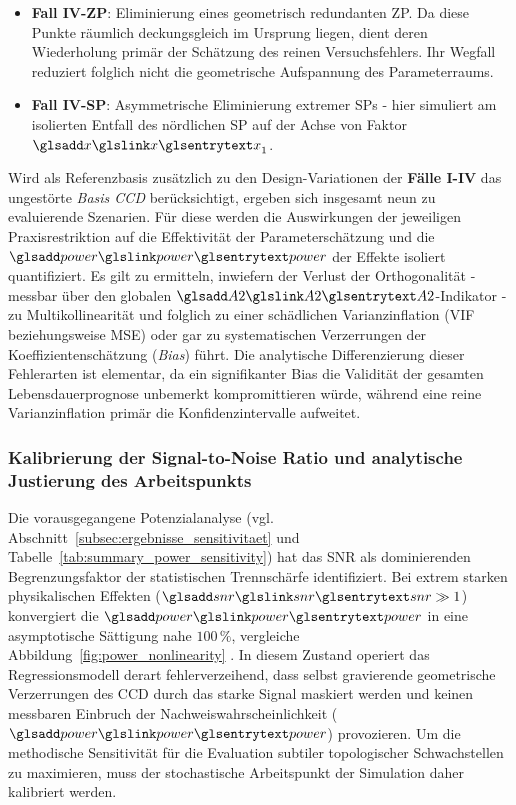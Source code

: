 \begin{itemize}
          \begin{itemize}
              \item \textbf{Fall IV-\ac{ZP}}: Eliminierung eines geometrisch redundanten \ac{ZP}. Da diese Punkte räumlich deckungsgleich im Ursprung liegen, dient deren Wiederholung primär der Schätzung des reinen Versuchsfehlers. Ihr Wegfall reduziert folglich nicht die geometrische Aufspannung des Parameterraums.
              \item \textbf{Fall IV-\ac{SP}}: Asymmetrische Eliminierung extremer \acp{SP} - hier simuliert am isolierten Entfall des nördlichen \ac{SP} auf der Achse von Faktor $\sym{x}_1$.
          \end{itemize}
\end{itemize}

Wird als Referenzbasis zusätzlich zu den Design-Variationen der \textbf{Fälle I-IV} das ungestörte \textit{Basis \ac{CCD}} berücksichtigt, ergeben sich insgesamt neun zu evaluierende Szenarien.
Für diese werden die Auswirkungen der jeweiligen Praxisrestriktion auf die Effektivität der Parameterschätzung und die $\sym{power}$ der Effekte isoliert quantifiziert.
Es gilt zu ermitteln, inwiefern der Verlust der Orthogonalität - messbar über den globalen $\sym{A2}$-Indikator - zu Multikollinearität und folglich zu einer schädlichen Varianzinflation (\ac{VIF} beziehungsweise \ac{MSE}) oder gar zu systematischen Verzerrungen der Koeffizientenschätzung (\textit{Bias}) führt.
Die analytische Differenzierung dieser Fehlerarten ist elementar, da ein signifikanter Bias die Validität der gesamten Lebensdauerprognose unbemerkt kompromittieren würde, während eine reine Varianzinflation primär die Konfidenzintervalle aufweitet.

\subsubsection{Kalibrierung der Signal-to-Noise Ratio und analytische Justierung des Arbeitspunkts}

Die vorausgegangene Potenzialanalyse (vgl. Abschnitt~\ref{subsec:ergebnisse_sensitivitaet} und Tabelle~\ref{tab:summary_power_sensitivity}) hat das \ac{SNR} als dominierenden Begrenzungsfaktor der statistischen Trennschärfe identifiziert.
Bei extrem starken physikalischen Effekten ($\sym{snr} \gg 1$) konvergiert die $\sym{power}$ in eine asymptotische Sättigung nahe $100\,\%$, vergleiche Abbildung~\ref{fig:power_nonlinearity} \cite{Cohen.1988}.
In diesem Zustand operiert das Regressionsmodell derart fehlerverzeihend, dass selbst gravierende geometrische Verzerrungen des \ac{CCD} durch das starke Signal maskiert werden und keinen messbaren Einbruch der Nachweiswahrscheinlichkeit ($\sym{power}$) provozieren.
Um die methodische Sensitivität für die Evaluation subtiler topologischer Schwachstellen zu maximieren, muss der stochastische Arbeitspunkt der Simulation daher kalibriert werden.

